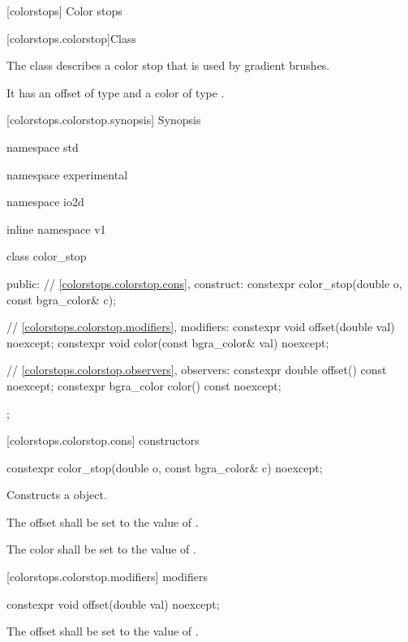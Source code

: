  [colorstops] {Color stops}

 [colorstops.colorstop]{Class }

\pnum
{}
The class  describes a color stop that is used by gradient brushes.

\pnum
It has an offset of type  and a color of type .

 [colorstops.colorstop.synopsis] { Synopsis}

\begin{codeblock}
namespace std { namespace experimental { namespace io2d { inline namespace v1 {
  class color_stop {
  public:
  	// \ref{colorstops.colorstop.cons}, construct:
    constexpr color_stop(double o, const bgra_color& c);
    
    // \ref{colorstops.colorstop.modifiers}, modifiers:
    constexpr void offset(double val) noexcept;
	constexpr void color(const bgra_color& val) noexcept;
	
    // \ref{colorstops.colorstop.observers}, observers:
	constexpr double offset() const noexcept;
	constexpr bgra_color color() const noexcept;
  };
} } } }
\end{codeblock}

 [colorstops.colorstop.cons]{ constructors}

\begin{itemdecl}
	constexpr color_stop(double o, const bgra_color& c) noexcept;
\end{itemdecl}
\begin{itemdescr}
	\pnum
	\effects
	Constructs a  object.
	
	\pnum
	The offset shall be set to the value of .
	
	\pnum
	The color shall be set to the value of .
\end{itemdescr}

 [colorstops.colorstop.modifiers]{ modifiers}

\begin{itemdecl}
	constexpr void offset(double val) noexcept;
\end{itemdecl}
\begin{itemdescr}
	\pnum
	\effects
	The offset shall be set to the value of .
\end{itemdescr}

